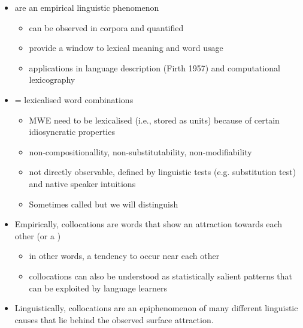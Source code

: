 \documentclass[a4paper,landscape,headrule,footrule,dvips]{foils}
\begin{document}
\begin{CJK}{UTF8}{min}

\begin{itemize}
\item {} are an empirical linguistic phenomenon
\begin{itemize}
\item can be observed in corpora and quantified
\item provide a window to lexical meaning and word usage
\item applications in language description (Firth 1957) and
computational lexicography \citep{Sinclair:1991}
\end{itemize}
\item {} = lexicalised word combinations
\begin{itemize}
\item MWE need to be lexicalised (i.e., stored as units) because
of certain idiosyncratic properties
\item non-compositionallity, non-substitutability, non-modifiability
  \citep{Manning:Schuetze:1999}
\item not directly observable, defined by linguistic tests
(e.g. substitution test) and native speaker intuitions
\item Sometimes called  but we will distinguish
\end{itemize}
\end{itemize}


\begin{itemize}
\item   Empirically, collocations are words that show an attraction towards
  each other (or a ) 
\begin{itemize}
\item in other words, a tendency to
  occur near each other
\item  collocations can also be understood as
  statistically salient patterns that can be exploited by language
  learners
\end{itemize}
\item Linguistically, collocations are an epiphenomenon of many
  different linguistic causes that lie behind the observed surface
  attraction.   

\end{itemize}


\end{CJK}
\end{document}
